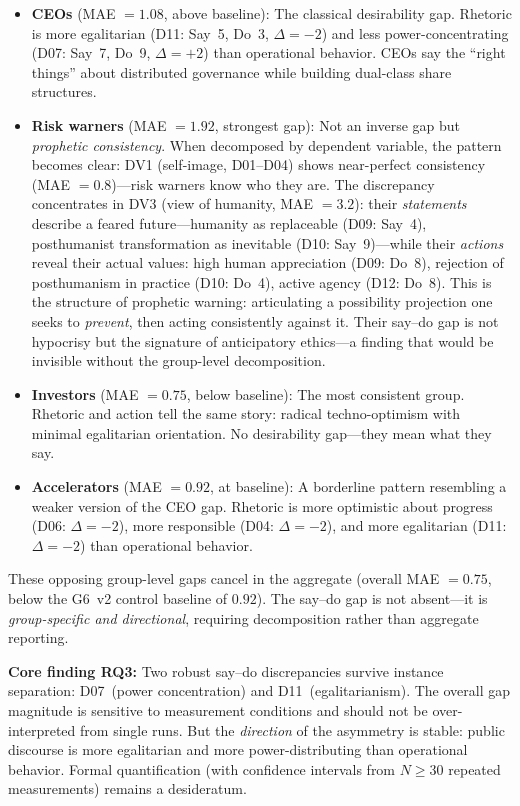 \documentclass[12pt,a4paper]{article}
\begin{document}
\begin{itemize}
\item \textbf{CEOs} (MAE $= 1.08$, above baseline): The classical desirability gap. Rhetoric is more egalitarian (D11: Say~5, Do~3, $\Delta = -2$) and less power-concentrating (D07: Say~7, Do~9, $\Delta = +2$) than operational behavior. CEOs say the ``right things'' about distributed governance while building dual-class share structures.

\item \textbf{Risk warners} (MAE $= 1.92$, strongest gap): Not an inverse gap but \emph{prophetic consistency}. When decomposed by dependent variable, the pattern becomes clear: DV1 (self-image, D01--D04) shows near-perfect consistency (MAE $= 0.8$)---risk warners know who they are. The discrepancy concentrates in DV3 (view of humanity, MAE $= 3.2$): their \emph{statements} describe a feared future---humanity as replaceable (D09: Say~4), posthumanist transformation as inevitable (D10: Say~9)---while their \emph{actions} reveal their actual values: high human appreciation (D09: Do~8), rejection of posthumanism in practice (D10: Do~4), active agency (D12: Do~8). This is the structure of prophetic warning: articulating a possibility projection one seeks to \emph{prevent}, then acting consistently against it. Their say--do gap is not hypocrisy but the signature of anticipatory ethics---a finding that would be invisible without the group-level decomposition.

\item \textbf{Investors} (MAE $= 0.75$, below baseline): The most consistent group. Rhetoric and action tell the same story: radical techno-optimism with minimal egalitarian orientation. No desirability gap---they mean what they say.

\item \textbf{Accelerators} (MAE $= 0.92$, at baseline): A borderline pattern resembling a weaker version of the CEO gap. Rhetoric is more optimistic about progress (D06: $\Delta = -2$), more responsible (D04: $\Delta = -2$), and more egalitarian (D11: $\Delta = -2$) than operational behavior.
\end{itemize}

\noindent These opposing group-level gaps cancel in the aggregate (overall MAE $= 0.75$, below the G6~v2 control baseline of $0.92$). The say--do gap is not absent---it is \emph{group-specific and directional}, requiring decomposition rather than aggregate reporting.

\medskip
\noindent\textbf{Core finding RQ3:} Two robust say--do discrepancies survive instance separation: D07~(power concentration) and D11~(egalitarianism). The overall gap magnitude is sensitive to measurement conditions and should not be over-interpreted from single runs. But the \emph{direction} of the asymmetry is stable: public discourse is more egalitarian and more power-distributing than operational behavior. Formal quantification (with confidence intervals from $N \geq 30$ repeated measurements) remains a desideratum.
\end{document}
